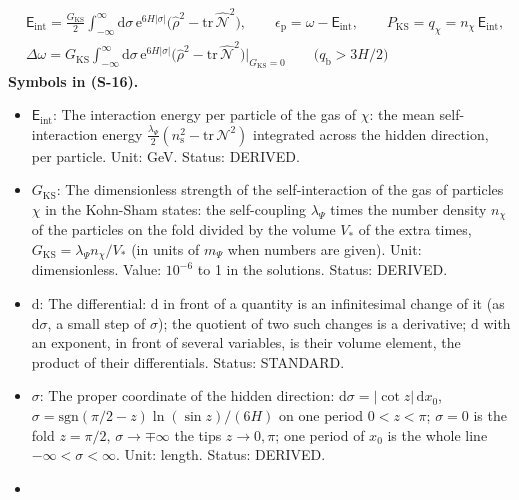 \documentclass[
  10pt,
]{article}
\providecommand{\tightlist}{%
  \setlength{\itemsep}{0pt}\setlength{\parskip}{0pt}}
\begin{document}
\[
\begin{aligned}
&\mathsf{E}_{\mathrm{int}} = \frac{G_{\mathrm{KS}}}{2}\int_{-\infty}^{\infty}\mathrm{d}\sigma\,\mathrm{e}^{6H\lvert\sigma\rvert}\Big(\hat\rho^2 - \mathrm{tr}\,\hat{\mathcal{N}}^2\Big),\qquad
 \epsilon_{\mathrm{p}} = \omega - \mathsf{E}_{\mathrm{int}},\qquad P_{\mathrm{KS}} = q_\chi = n_\chi\,\mathsf{E}_{\mathrm{int}},\\
&\Delta\omega = G_{\mathrm{KS}}\int_{-\infty}^{\infty}\mathrm{d}\sigma\,\mathrm{e}^{6H\lvert\sigma\rvert}\Big(\hat\rho^2 - \mathrm{tr}\,\hat{\mathcal{N}}^2\Big)\Big\vert_{G_{\mathrm{KS}} = 0}\qquad\big(q_{\mathrm{b}} > 3H/2\big)
\end{aligned} \tag{S-16}
\] \textbf{Symbols in (S-16).}

\begin{itemize}
\tightlist
\item
  \(\mathsf{E}_{\mathrm{int}}\): The interaction energy per particle of
  the gas of \(\chi\): the mean self-interaction energy
  \(\frac{\lambda_\Psi}{2}(n_{\mathrm{s}}^2 - \mathrm{tr}\,\mathcal{N}^2)\)
  integrated across the hidden direction, per particle. Unit: GeV.
  Status: DERIVED.
\item
  \(G_{\mathrm{KS}}\): The dimensionless strength of the
  self-interaction of the gas of particles \(\chi\) in the Kohn-Sham
  states: the self-coupling \(\lambda_\Psi\) times the number density
  \(n_\chi\) of the particles on the fold divided by the volume \(V_*\)
  of the extra times, \(G_{\mathrm{KS}} = \lambda_\Psi n_\chi/V_*\) (in
  units of \(m_\Psi\) when numbers are given). Unit: dimensionless.
  Value: \(10^{-6}\) to 1 in the solutions. Status: DERIVED.
\item
  \(\mathrm{d}\): The differential: \(\mathrm{d}\) in front of a
  quantity is an infinitesimal change of it (as \(\mathrm{d}\sigma\), a
  small step of \(\sigma\)); the quotient of two such changes is a
  derivative; \(\mathrm{d}\) with an exponent, in front of several
  variables, is their volume element, the product of their
  differentials. Status: STANDARD.
\item
  \(\sigma\): The proper coordinate of the hidden direction:
  \(\mathrm{d}\sigma = \lvert\cot z\rvert\,\mathrm{d}x_0\),
  \(\sigma = \mathrm{sgn}(\pi/2 - z)\ln(\sin z)/(6H)\) on one period
  \(0 < z < \pi\); \(\sigma = 0\) is the fold \(z = \pi/2\),
  \(\sigma \to \mp\infty\) the tips \(z \to 0, \pi\); one period of
  \(x_0\) is the whole line \(-\infty < \sigma < \infty\). Unit: length.
  Status: DERIVED.
\item

\end{itemize}
\end{document}
